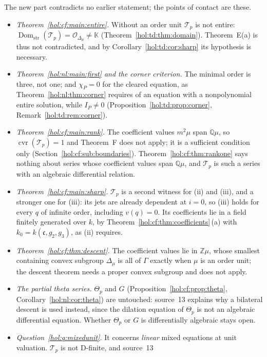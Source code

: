 \documentclass[11pt]{article}
\numberwithin{equation}{section}
\theoremstyle{definition}
\theoremstyle{remark}
\newcommand{\Q}{\mathbb Q}
\newcommand{\Z}{\mathbb Z}
\newcommand{\Dom}{\operatorname{Dom}_{\mathrm{str}}}
\newcommand{\KK}{\mathbb K}
\newcommand{\cvr}{\operatorname{cvr}}
\begin{document}
The new part contradicts no earlier statement; the points of contact are these.
\begin{itemize}
\item \emph{Theorem~\ref{hol:cf:main:entire}.} Without an order unit
$\mathcal T_p$ is not entire: $\Dom(\mathcal T_p)=\mathcal O_{\Delta_\mu}\ne\KK$
(Theorem~\ref{hol:td:thm:domain}). Theorem~E(a) is thus not contradicted, and
by Corollary~\ref{hol:td:cor:sharp} its hypothesis is necessary.
\item \emph{Theorem~\ref{hol:nl:main:first} and the corner criterion.} The
minimal order is three, not one; and $\chi_P=0$ for the cleared equation, as
Theorem~\ref{hol:nl:thm:corner} requires of an equation with a nonpolynomial
entire solution, while $I_P\ne0$ (Proposition~\ref{hol:td:prop:corner},
Remark~\ref{hol:td:rem:corner}).
\item \emph{Theorem~\ref{hol:cf:main:rank}.} The coefficient values $m^2\mu$
span $\Q\mu$, so $\cvr(\mathcal T_p)=1$ and Theorem~F does not apply; it is a
sufficient condition only (Section~\ref{hol:cf:sub:boundaries}).
Theorem~\ref{hol:cf:thm:rankone} says nothing about series whose coefficient
values span $\Q\mu$, and $\mathcal T_p$ is such a series with an algebraic
differential relation.
\item \emph{Theorem~\ref{hol:cf:main:sharp}.} $\mathcal T_p$ is a second
witness for (ii) and (iii), and a stronger one for (iii): its jets are already
dependent at $i=0$, so (iii) holds for every $q$ of infinite order, including
$v(q)=0$. Its coefficients lie in a field finitely generated over $k$, by
Theorem~\ref{hol:cf:thm:coefficients}\,(a) with $k_0=k(\mathfrak c,g_2,g_3)$,
as (ii) requires.
\item \emph{Theorem~\ref{hol:cf:thm:descent}.} The coefficient values lie in
$\Z\mu$, whose smallest containing convex subgroup $\Delta_\mu$ is all of
$\Gamma$ exactly when $\mu$ is an order unit; the descent theorem needs a
proper convex subgroup and does not apply.
\item \emph{The partial theta series.} $\Theta_p$ and $G$
(Proposition~\ref{hol:cf:prop:theta}, Corollary~\ref{hol:nl:cor:theta}) are
untouched: source~13 explains why a bilateral descent is used instead, since
the dilation equation of $\Theta_p$ is not an algebraic differential equation.
Whether $\Theta_p$ or $G$ is differentially algebraic stays open.
\item \emph{Question~\ref{hol:q:mixedunit}.} It concerns \emph{linear} mixed
equations at unit valuation. $\mathcal T_p$ is not D-finite, and source~13

\end{itemize}
\end{document}
